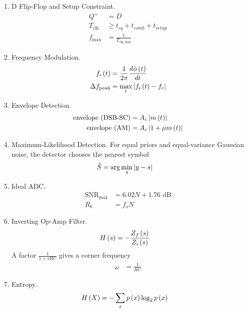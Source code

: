\begin{enumerate}[label=\thesubsection.\arabic*, ref=\thesubsection.\theenumi]
\begin{align}
X + \overline{Y} + 1 &= X + \brak{2^n - 1} - Y + 1
\\
&= X - Y + 2^n
\\
&\equiv X - Y \pmod{2^n}
\end{align}
\item D Flip-Flop and Setup Constraint.
\begin{align}
Q^{+} &= D
\label{eq:F-dff}
\\
T_{\mathrm{clk}} &\ge t_{cq} + t_{comb} + t_{setup}
\\
f_{\max} &= \frac{1}{T_{\mathrm{clk,min}}}
\label{eq:F-setup}
\end{align}
\item Frequency Modulation.
\begin{align}
f_i\left(t\right) &= \frac{1}{2\pi} \frac{d\phi\left(t\right)}{dt}
\\
\Delta f_{\mathrm{peak}} &= \max_{t} \left\vert f_i\left(t\right) - f_c\right\vert
\label{eq:F-fm}
\end{align}
\item Envelope Detection.
\begin{align}
\text{envelope (DSB-SC)} &= A_c \left\vert m\left(t\right)\right\vert
\\
\text{envelope (AM)} &= A_c \left\vert1 + \mu m\left(t\right)\right\vert
\label{eq:F-envelope}
\end{align}
\item Maximum-Likelihood Detection. For equal priors and equal-variance Gaussian noise, the detector chooses the nearest symbol
\begin{align}
\hat{S} &= \arg\min_{s} \left\vert y - s\right\vert
\label{eq:F-ml}
\end{align}
\item Ideal ADC.
\begin{align}
\mathrm{SNR}_{\max} &= 6.02 N + 1.76 \text{ dB}
\\
R_b &= f_s N
\label{eq:F-adc}
\end{align}
\item Inverting Op-Amp Filter.
\begin{align}
H\left(s\right) &= -\frac{Z_f\left(s\right)}{Z_i\left(s\right)}
\label{eq:F-inv}
\end{align}
A factor $\frac{1}{1 + sRC}$ gives a corner frequency
\begin{align}
\omega &= \frac{1}{RC}
\label{eq:F-corner}
\end{align}
\item Entropy.
\begin{align}
H\left(X\right) &= -\sum_{x} p\left(x\right) \log_2 p\left(x\right)
\label{eq:F-entropy}
\end{align}

\end{enumerate}
